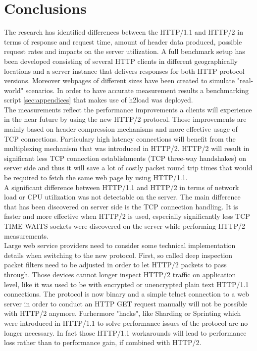\section{Conclusions}
\label{conclusion}

The research has identified differences between the HTTP/1.1 and HTTP/2 in terms of response and request time, amount of header data produced, possible request rates and impacts on the server utilization. A full benchmark setup has been developed consisting of several HTTP clients in different geographically locations and a server instance that delivers responses for both HTTP protocol versions. Moreover webpages of different sizes have been created to simulate "real-world" scenarios. In order to have accurate measurement results a benchmarking script \ref{sec:appendices} that makes use of h2load \cite{h2load} was deployed. 
\\
The measurements reflect the performance improvements a clients will experience in the near future by using the new HTTP/2 protocol. Those improvements are mainly based on header compression mechanisms and more effective usage of TCP connections. Particulary high latency connections will benefit from the multiplexing mechanism that was introduced in HTTP/2. HTTP/2 will result in significant less TCP connection establishments (TCP three-way handshakes) on server side and thus it will save a lot of costly packet round trip times that would be required to fetch the same web page by using HTTP/1.1.
\\
A significant difference between HTTP/1.1 and HTTP/2 in terms of network load or CPU utilization was not detectable on the server. The main difference that has been discovered on server side is the TCP connection handling. It is faster and more effective when HTTP/2 is used, especially significantly less TCP TIME WAITS sockets were discovered on the server while performing HTTP/2 measurements.
\\
Large web service providers need to consider some technical implementation details when switching to the new protocol. First, so called deep inspection packet filters need to be adjusted in order to let HTTP/2 packets to pass through. Those devices cannot longer inspect HTTP/2 traffic on application level, like it was used to be with encrypted or unencrypted plain text HTTP/1.1 connections. The protocol is now binary and a simple telnet connection to a web server in order to conduct an HTTP GET request manually will not be possible with HTTP/2 anymore. Furhermore "hacks", like Sharding or Sprinting which were introduced in HTTP/1.1 to solve performance issues of the protocol are no longer necessary. In fact those HTTP/1.1 workarounds will lead to performance loss rather than to performance gain, if combined with HTTP/2.    

